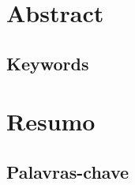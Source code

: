  \setcounter{page}{0}

\section*{\huge Abstract}

\subsection*{\large Keywords}


\newpage

\section*{\huge Resumo}

\subsection*{Palavras-chave}

